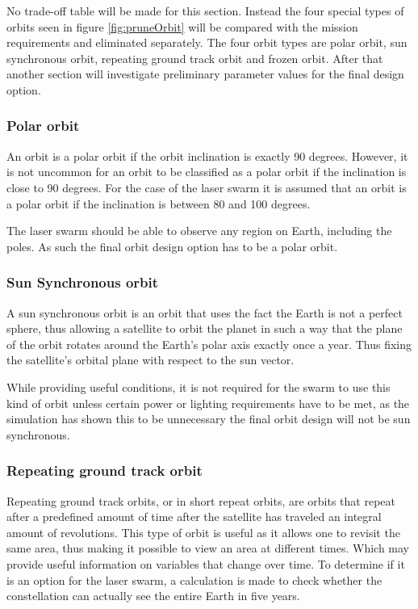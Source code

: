 No trade-off table will be made for this section. Instead the four special types of orbits seen in figure \ref{fig:pruneOrbit} will be compared with the mission requirements and eliminated separately. The four orbit types are polar orbit, sun synchronous orbit, repeating ground track orbit and frozen orbit. After that another section will investigate preliminary parameter values for the final design option.

\subsubsection{Polar orbit}

An orbit is a polar orbit if the orbit inclination is exactly 90 degrees. However, it is not uncommon for an orbit to be classified as a polar orbit if the inclination is close to 90 degrees. For the case of the laser swarm it is assumed that an orbit is a polar orbit if the inclination is between 80 and 100 degrees.

The laser swarm should be able to observe any region on Earth, including the poles. As such the final orbit design option has to be a polar orbit.

\subsubsection{Sun Synchronous orbit}
A sun synchronous orbit is an orbit that uses the fact the Earth is not a perfect sphere, thus allowing a satellite to orbit the planet in such a way that the plane of the orbit rotates around the Earth's polar axis exactly once a year. Thus fixing the satellite's orbital plane with respect to the sun vector.

While providing useful conditions, it is not required for the swarm to use this kind of orbit unless certain power or lighting requirements have to be met, as the simulation has shown this to be unnecessary the final orbit design will not be sun synchronous.

\subsubsection{Repeating ground track orbit}
Repeating ground track orbits, or in short repeat orbits, are orbits that repeat after a predefined amount of time after the satellite has traveled an integral amount of revolutions. This type of orbit is useful as it allows one to revisit the same area, thus making it possible to view an area at different times. Which may provide useful information on variables that change over time.
To determine if it is an option for the laser swarm, a calculation is made to check whether the constellation can actually see the entire Earth in five years.

